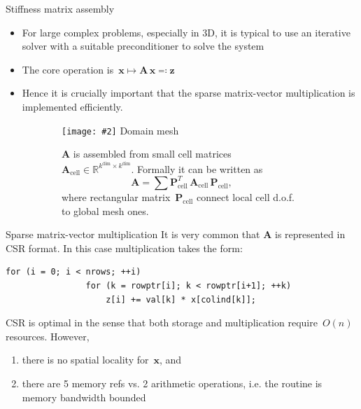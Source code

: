 \documentclass[svgnames]{beamer} %
\newcommand{\includegraphicsw}[2][1.]{\texttt{[image: \#2]}}
\newcommand{\vect}[1]{\boldsymbol{\mathbf{#1}}}
\begin{document}
	\begin{frame}{Stiffness matrix assembly}
		\begin{itemize}
		\item For large complex problems, especially in 3D, it is typical to use an iterative solver with a suitable preconditioner to solve the system
		\item The core operation is~$\vect x \mapsto \vect A\,\vect x \eqqcolon \vect z$
		\item Hence it is crucially important that the sparse matrix-vector multiplication is implemented efficiently.
		\end{itemize}
		\begin{figure}
			\begin{subfigure}{.45\linewidth}
				\centering
				\includegraphicsw[.8]{mesh.png}
				Domain mesh
			\end{subfigure}%
			\begin{subfigure}{.55\linewidth}
				$\vect A$ is assembled from small cell matrices~$\vect A_\text{cell} \in \mathbb R^{k^{\text{dim}}\times k^{\text{dim}}}$. Formally it can be written as
				$$
					\vect A = \sum \vect P^T_\text{cell}\,\vect A_\text{cell}\,\vect P_\text{cell},
				$$
				where rectangular matrix~$\vect P_\text{cell}$ connect local cell d.o.f. to global mesh ones.
			\end{subfigure}
		\end{figure}
	\end{frame}	

	\begin{frame}[fragile]{Sparse matrix-vector multiplication}
		It is very common that $\vect A$ is represented in CSR format. In this case multiplication takes the form:
		\begin{lstlisting}[basicstyle=\small]
			for (i = 0; i < nrows; ++i) 
				for (k = rowptr[i]; k < rowptr[i+1]; ++k)
					z[i] += val[k] * x[colind[k]];
		\end{lstlisting}
		CSR is optimal in the sense that both storage and multiplication require~$O(n)$ resources. However,
		\begin{enumerate}
			\item there is no spatial locality for~$\vect x$, and
			\item there are 5 memory refs vs. 2 arithmetic operations, i.e. the routine is memory bandwidth bounded
		\end{enumerate}
	\end{frame}	
	
\end{document}
